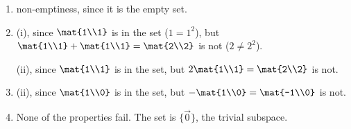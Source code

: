 \begin{exercises}
\begin{problist}
\begin{solution}
\begin{enumerate}
					(ii), since $\mat{4\\0\\0}$ is in the set, but $0\cdot \mat{4\\0\\0}=\vec 0$ is not.

				\item non-emptiness, since it is the empty set.

				\item (i), since $\mat{1\\1}$ is in the set ($1=1^2$), but $\mat{1\\1}+\mat{1\\1}=\mat{2\\2}$ is not ($2\neq2^2$).

					(ii), since $\mat{1\\1}$ is in the set, but $2\mat{1\\1}=\mat{2\\2}$ is not.

				\item (ii), since $\mat{1\\0}$ is in the set, but $-\mat{1\\0}=\mat{-1\\0}$ is not.

				\item None of the properties fail. The set is $\{\vec 0\}$, the trivial subspace.
			\end{enumerate}
		\end{solution}


\end{problist}
\end{exercises}
